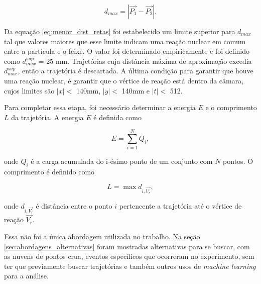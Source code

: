 \documentclass[a4paper,12pt,oneside]{book}
\begin{document}
\begin{equation} \label{eq:menor_dist_retas}
    d_{max} = \left | \vec{P_1} - \vec{P_2} \right |.
\end{equation}


\par Da equação \ref{eq:menor_dist_retas} foi estabelecido um limite superior para $d_{max}$ tal que valores maiores que esse limite indicam uma reação nuclear em comum entre a partícula e o feixe. O valor foi determinado empiricamente e foi definido como $d_{max}^{sup}$ = 25 mm. Trajetórias cuja distância máxima de aproximação excedia $d_{max}^{sup}$, então a trajetória é descartada. A última condição para garantir que houve uma reação nuclear, é garantir que o vértice de reação está dentro da câmara, cujos limites são $|x| < $ 140mm, $|y| < $ 140mm e $|t| < $ 512.

\par Para completar essa etapa, foi necessário determinar a energia $E$ e o comprimento $L$ da trajetória. A energia $E$ é definida como

\begin{equation}\label{eq:carga_acumulada}
	E = \sum_{i = 1}^{N} Q_i,
\end{equation}

\par onde $Q_i$ é a carga acumulada do i-ésimo ponto de um conjunto com $N$ pontos. O comprimento é definido como

\begin{equation}\label{eq:comprimento_trajetoria}
	L = \max{d_{i, \vec{V_r}}},
\end{equation}

\par onde $d_{i, \vec{V_r}}$ é distância entre o ponto $i$ pertencente a trajetória até o vértice de reação $\vec{V_r}$.

\par Essa não foi a única abordagem utilizada no trabalho. Na seção \ref{sec:abordagens_alternativas} foram mostradas alternativas para se buscar, com as nuvens de pontos crua, eventos específicos que ocorreram no experimento, sem ter que previamente buscar trajetórias e também outros usos de \textit{machine learning} para a análise.
\end{document}
